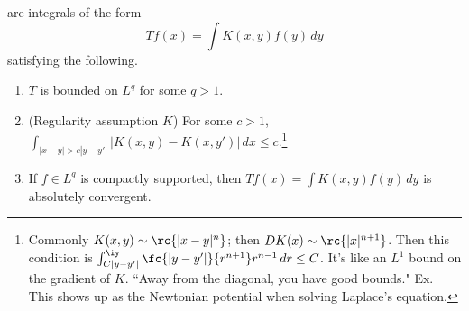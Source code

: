 \begin{df}
 are integrals of the form
\[
Tf(x)=\int K(x,y) f(y)\,dy
\]
satisfying the following.
\begin{enumerate}
\item
$T$ is bounded on $L^q$ for some $q>1$.
\item
(Regularity assumption $K$)
For some $c>1$, $\int_{|x-y|>c|y-y'|} |K(x,y)-K(x,y')|\,dx\le c$.\footnote{Commonly $K(x,y)\sim \rc{|x-y|^n}$; then $DK(x)\sim \rc{|x|^{n+1}}$. Then this condition is $\int_{C|y-y'|}^{\iy} \fc{|y-y'|}{r^{n+1}} r^{n-1}\,dr\le C$.
It's like an $L^1$ bound on the gradient of $K$.
``Away from the diagonal, you have good bounds." Ex. This shows up as the Newtonian potential when solving Laplace's equation.}
\item If $f\in L^q$ is compactly supported, then $Tf(x)=\int K(x,y)f(y)\,dy$ is absolutely convergent.
\end{enumerate}
\end{df}

